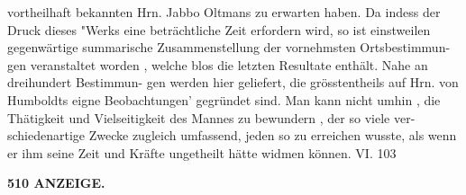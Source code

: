 \documentclass[12pt,a4paper]{article}
\begin{document}
vortheilhaft  bekannten  Hrn. Jabbo  Oltmans  zu  erwarten  haben.  Da  indess  der  Druck  dieses  "Werks  eine  beträchtliche  Zeit  erfordern wird,  so  ist  einstweilen  gegenwärtige  summarische  Zusammenstellung  der  vornehmsten  Ortsbestimmun- gen veranstaltet  worden ,  welche  blos  die  letzten  Resultate  enthält.  Nahe  an  dreihundert  Bestimmun- gen werden  hier  geliefert,  die  grösstentheils  auf  Hrn.  von  Humboldts  eigne  Beobachtungen' gegründet  sind. Man  kann  nicht  umhin ,  die  Thätigkeit  und  Vielseitigkeit  des  Mannes  zu  bewundern ,  der  so  viele  ver- schiedenartige Zwecke  zugleich  umfassend,  jeden  so  zu  erreichen  wusste,  als  wenn  er  ihm  seine  Zeit und  Kräfte  ungetheilt  hätte  widmen  können. VI. 103

\vspace{0.5em}


\noindent\textbf{510  ANZEIGE.}
\end{document}

